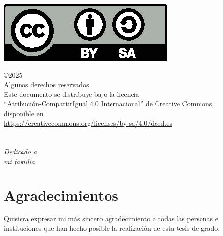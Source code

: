 \documentclass[a4paper, 12pt]{book}
\makeatletter
\let\theauthor\@author
\makeatother
\begin{document}
\vspace{12cm}


\begin{flushright}
\includegraphics[scale=0.6]{img/by-sa}

\noindent©2025 \theauthor  \\
Algunos derechos reservados  \\
Este documento se distribuye bajo la licencia \\
``Atribución-CompartirIgual 4.0 Internacional'' de Creative Commons, \\
disponible en \\
\url{https://creativecommons.org/licenses/by-sa/4.0/deed.es}
\end{flushright}


\chapter*{}
\begin{flushright}
\textit{Dedicado a \\
mi familia.}
\end{flushright}


\chapter*{Agradecimientos}

Quisiera expresar mi más sincero agradecimiento a todas las personas e instituciones que han hecho posible la realización de esta tesis de grado.
\end{document}
